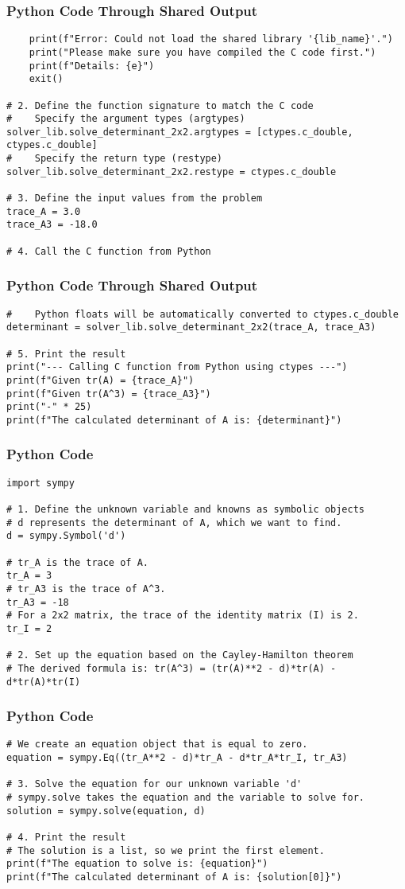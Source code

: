 \documentclass{beamer}
\begin{document}
    \begin{frame}[fragile]
    \frametitle{Python Code Through Shared Output}
    \begin{lstlisting}
    print(f"Error: Could not load the shared library '{lib_name}'.")
    print("Please make sure you have compiled the C code first.")
    print(f"Details: {e}")
    exit()

# 2. Define the function signature to match the C code
#    Specify the argument types (argtypes)
solver_lib.solve_determinant_2x2.argtypes = [ctypes.c_double, ctypes.c_double]
#    Specify the return type (restype)
solver_lib.solve_determinant_2x2.restype = ctypes.c_double

# 3. Define the input values from the problem
trace_A = 3.0
trace_A3 = -18.0

# 4. Call the C function from Python
    \end{lstlisting}
    \end{frame}
    \begin{frame}[fragile]
    \frametitle{Python Code Through Shared Output}
    \begin{lstlisting}
#    Python floats will be automatically converted to ctypes.c_double
determinant = solver_lib.solve_determinant_2x2(trace_A, trace_A3)

# 5. Print the result
print("--- Calling C function from Python using ctypes ---")
print(f"Given tr(A) = {trace_A}")
print(f"Given tr(A^3) = {trace_A3}")
print("-" * 25)
print(f"The calculated determinant of A is: {determinant}")
    \end{lstlisting}
    \end{frame}
    \begin{frame}[fragile]
    \frametitle{Python Code}
    \begin{lstlisting}
import sympy

# 1. Define the unknown variable and knowns as symbolic objects
# d represents the determinant of A, which we want to find.
d = sympy.Symbol('d')

# tr_A is the trace of A.
tr_A = 3
# tr_A3 is the trace of A^3.
tr_A3 = -18
# For a 2x2 matrix, the trace of the identity matrix (I) is 2.
tr_I = 2

# 2. Set up the equation based on the Cayley-Hamilton theorem
# The derived formula is: tr(A^3) = (tr(A)**2 - d)*tr(A) - d*tr(A)*tr(I)
    \end{lstlisting}
    \end{frame}
    \begin{frame}[fragile]
    \frametitle{Python Code}
    \begin{lstlisting}
# We create an equation object that is equal to zero.
equation = sympy.Eq((tr_A**2 - d)*tr_A - d*tr_A*tr_I, tr_A3)

# 3. Solve the equation for our unknown variable 'd'
# sympy.solve takes the equation and the variable to solve for.
solution = sympy.solve(equation, d)

# 4. Print the result
# The solution is a list, so we print the first element.
print(f"The equation to solve is: {equation}")
print(f"The calculated determinant of A is: {solution[0]}")
\end{lstlisting}
\end{frame}
\end{document}
